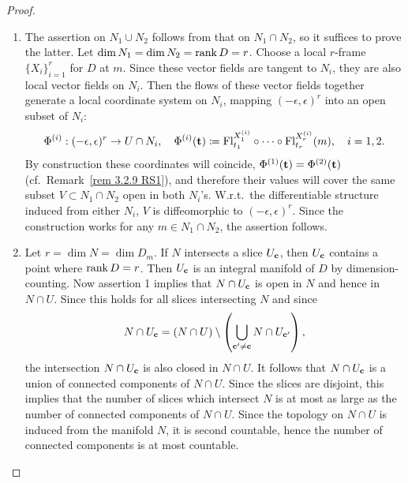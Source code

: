 \begin{proof}
\begin{enumerate}
    \item The assertion on $N_1\cup N_2$ follows from that on $N_1\cap N_2$, so it suffices to prove the latter. Let $\dim N_1=\dim N_2=\rank D=r$. Choose a local $r$-frame $\{X_i\}_{i=1}^r$ for $D$ at $m$. Since these vector fields are tangent to $N_i$, they are also local vector fields on $N_i$. Then the flows of these vector fields together generate a local coordinate system on $N_i$, mapping $(-\epsilon,\epsilon)^r$ into an open subset of $N_i$:
    \[\Phi^{(i)}:(-\epsilon,\epsilon)^r\to U\cap N_i,\quad \Phi^{(i)}(\bf{t})\coloneqq \Fl^{X^{(i)}_1}_{t_1}\circ \cdots\circ \Fl^{X^{(i)}_r}_{t_r}(m),\quad i=1,2.\]
    By construction these coordinates will coincide, $\Phi^{(1)}(\bf{t})=\Phi^{(2)}(\bf{t})$ (cf.\ Remark~\ref{rem 3.2.9 RS1}), and therefore their values will cover the same subset $V\subset N_1\cap N_2$ open in both $N_i$'s. W.r.t.~the differentiable structure induced from either $N_i$, $V$ is diffeomorphic to $(-\epsilon,\epsilon)^r$. Since the construction works for any $m\in N_1\cap N_2$, the assertion follows. 

    \item Let $r=\dim N=\dim D_m$. If $N$ intersects a slice $U_{\bf{c}}$, then $U_{\bf{c}}$ contains a point where $\rank D=r$. Then $U_{\bf{c}}$ is an integral manifold of $D$ by dimension-counting. Now assertion 1 implies that $N\cap U_{\bf{c}}$ is open in $N$ and hence in $N\cap U$. Since this holds for all slices intersecting $N$ and since
    \[N\cap U_{\bf{c}}=(N\cap U)\setminus\left(\bigcup_{\bf{c}'\neq \bf{c}}N\cap U_{\bf{c}'}\right),\]
    the intersection $N\cap U_{\bf{c}}$ is also closed in $N\cap U$. It follows that $N\cap U_{\bf{c}}$ is a union of connected components of $N\cap U$. Since the slices are disjoint, this implies that the number of slices which intersect $N$ is at most as large as the number of connected components of $N\cap U$. Since the topology on $N\cap U$ is induced from the manifold $N$, it is second countable, hence the number of connected components is at most countable.
\end{enumerate}
\end{proof}



